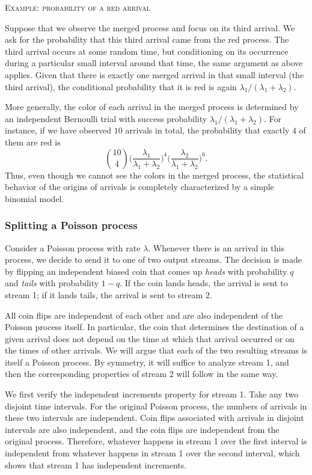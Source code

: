 \bigskip
\textsc{Example: probability of a red arrival}

Suppose that we observe the merged process and focus on its third arrival.  
We ask for the probability that this third arrival came from the red process.  
The third arrival occurs at some random time, but conditioning on its occurrence during a particular small interval around that time, the same argument as above applies.  
Given that there is exactly one merged arrival in that small interval (the third arrival), the conditional probability that it is red is again \(\lambda_1 / (\lambda_1 + \lambda_2)\).  

More generally, the color of each arrival in the merged process is determined by an independent Bernoulli trial with success probability \(\lambda_1 / (\lambda_1 + \lambda_2)\).  
For instance, if we have observed \(10\) arrivals in total, the probability that exactly \(4\) of them are red is
\[
\binom{10}{4}
\Big(\frac{\lambda_1}{\lambda_1 + \lambda_2}\Big)^{4}
\Big(\frac{\lambda_2}{\lambda_1 + \lambda_2}\Big)^{6}.
\]
Thus, even though we cannot see the colors in the merged process, the statistical behavior of the origins of arrivals is completely characterized by a simple binomial model.

\subsubsection{Splitting a Poisson process}

Consider a Poisson process with rate \(\lambda\).  
Whenever there is an arrival in this process, we decide to send it to one of two output streams.  
The decision is made by flipping an independent biased coin that comes up \textit{heads} with probability \(q\) and \textit{tails} with probability \(1-q\).  
If the coin lands heads, the arrival is sent to stream 1; if it lands tails, the arrival is sent to stream 2.  

All coin flips are independent of each other and are also independent of the Poisson process itself.  
In particular, the coin that determines the destination of a given arrival does not depend on the time at which that arrival occurred or on the times of other arrivals.  
We will argue that each of the two resulting streams is itself a Poisson process.  
By symmetry, it will suffice to analyze stream 1, and then the corresponding properties of stream 2 will follow in the same way.  

We first verify the independent increments property for stream 1.  
Take any two disjoint time intervals.  
For the original Poisson process, the numbers of arrivals in these two intervals are independent.  
Coin flips associated with arrivals in disjoint intervals are also independent, and the coin flips are independent from the original process.  
Therefore, whatever happens in stream 1 over the first interval is independent from whatever happens in stream 1 over the second interval, which shows that stream 1 has independent increments.  

